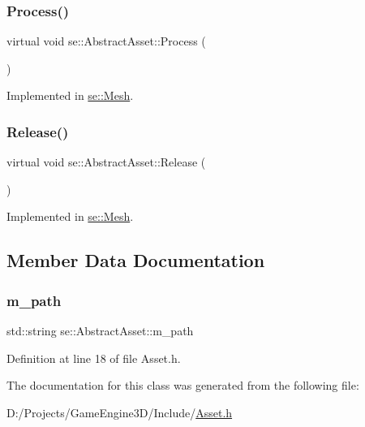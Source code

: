 \subsubsection{\texorpdfstring{Process()}{Process()}}
{\footnotesize\ttfamily virtual void se\+::\+Abstract\+Asset\+::\+Process (\begin{DoxyParamCaption}{ }\end{DoxyParamCaption})\hspace{0.3cm}{\ttfamily [pure virtual]}}



Implemented in \mbox{\hyperlink{classse_1_1_mesh_a1ae42a794ee240b5d6a0dd46aa4ea60d}{se\+::\+Mesh}}.

\mbox{\label{classse_1_1_abstract_asset_aea97e36f647efdb07a801b6fc468388d}} 
\subsubsection{\texorpdfstring{Release()}{Release()}}
{\footnotesize\ttfamily virtual void se\+::\+Abstract\+Asset\+::\+Release (\begin{DoxyParamCaption}{ }\end{DoxyParamCaption})\hspace{0.3cm}{\ttfamily [pure virtual]}}



Implemented in \mbox{\hyperlink{classse_1_1_mesh_afde4ccf6665a9b6c7a8f3635dd5139e0}{se\+::\+Mesh}}.



\subsection{Member Data Documentation}
\mbox{\label{classse_1_1_abstract_asset_afa609af58ca8617ef9ab7f6de84e121f}} 
\subsubsection{\texorpdfstring{m\+\_\+path}{m\_path}}
{\footnotesize\ttfamily std\+::string se\+::\+Abstract\+Asset\+::m\+\_\+path\hspace{0.3cm}{\ttfamily [protected]}}



Definition at line 18 of file Asset.\+h.



The documentation for this class was generated from the following file\+:\begin{DoxyCompactItemize}
\item 
D\+:/\+Projects/\+Game\+Engine3\+D/\+Include/\mbox{\hyperlink{_asset_8h}{Asset.\+h}}\end{DoxyCompactItemize}
